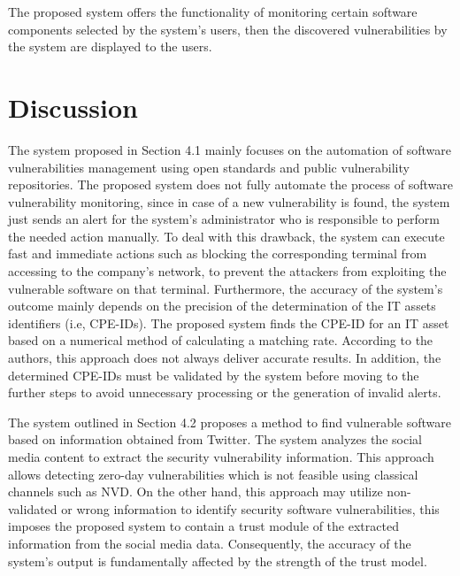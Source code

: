 \documentclass{llncs}
\begin{document}
The proposed system offers the functionality of monitoring certain software components selected by the system's users, then the discovered vulnerabilities by the system are displayed to the users.

\section{Discussion}

\par The system proposed in Section 4.1 mainly focuses on the automation of software vulnerabilities management using open standards and public vulnerability repositories. The proposed system does not fully automate the process of software vulnerability monitoring, since in case of a new vulnerability is found, the system just sends an alert for the system's administrator who is responsible to perform the needed action manually. To deal with this drawback, the system can execute fast and immediate actions such as  blocking the corresponding terminal from accessing to the company's network, to prevent the attackers from exploiting the vulnerable software on that terminal. Furthermore, the accuracy of the system's outcome mainly depends on the precision of the determination of the IT assets identifiers (i.e, CPE-IDs). The proposed system finds the CPE-ID for an IT asset based on a numerical method of calculating a matching rate. According to the authors, this approach does not always deliver accurate results. In addition, the determined CPE-IDs must be validated by the system before moving to the further steps to avoid unnecessary processing or the generation of invalid alerts.


\par The system outlined in Section 4.2 proposes a method to find vulnerable software based on information obtained from Twitter. The system analyzes the social media content to extract the security vulnerability information. This approach allows detecting zero-day vulnerabilities which is not feasible using classical channels such as NVD. On the other hand, this approach may utilize non- validated or wrong information to  identify security software vulnerabilities, this imposes the proposed system to contain a trust module of the extracted information from the social media data. Consequently, the accuracy of the system's output is  fundamentally affected by the strength of the trust model.
   
\end{document}
